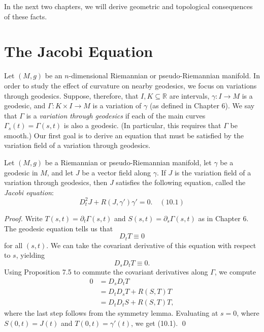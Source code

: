 In the next two chapters, we will derive geometric and topological consequences of these facts.


\section{The Jacobi Equation}

Let $(M, g)$ be an $n$-dimensional Riemannian or pseudo-Riemannian manifold. In order to study the effect of curvature on nearby geodesics, we focus on variations through geodesics. Suppose, therefore, that $I, K \subseteq \mathbb{R}$ are intervals, $\gamma: I \to M$ is a geodesic, and $\Gamma: K \times I \to M$ is a variation of $\gamma$ (as defined in Chapter 6). We say that $\Gamma$ is a \emph{variation through geodesics} if each of the main curves $\Gamma_s(t) = \Gamma(s,t)$ is also a geodesic. (In particular, this requires that $\Gamma$ be smooth.) Our first goal is to derive an equation that must be satisfied by the variation field of a variation through geodesics.

\begin{theorem}
\label{thm:jacobi-equation}
Let $(M, g)$ be a Riemannian or pseudo-Riemannian manifold, let $\gamma$ be a geodesic in $M$, and let $J$ be a vector field along $\gamma$. If $J$ is the variation field of a variation through geodesics, then $J$ satisfies the following equation, called the \emph{Jacobi equation}:
\[
D_t^2 J + R(J, \gamma')\gamma' = 0. \quad (10.1)
\]
\end{theorem}

\begin{proof}
Write $T(s,t) = \partial_t \Gamma(s,t)$ and $S(s,t) = \partial_s \Gamma(s,t)$ as in Chapter 6. The geodesic equation tells us that
\[
D_t T \equiv 0
\]
for all $(s,t)$. We can take the covariant derivative of this equation with respect to $s$, yielding
\[
D_s D_t T \equiv 0.
\]
Using Proposition 7.5 to commute the covariant derivatives along $\Gamma$, we compute
\begin{align*}
0 &= D_s D_t T \\
&= D_t D_s T + R(S,T)T \\
&= D_t D_t S + R(S,T)T,
\end{align*}
where the last step follows from the symmetry lemma. Evaluating at $s = 0$, where $S(0,t) = J(t)$ and $T(0,t) = \gamma'(t)$, we get (10.1). \qed
\end{proof}

